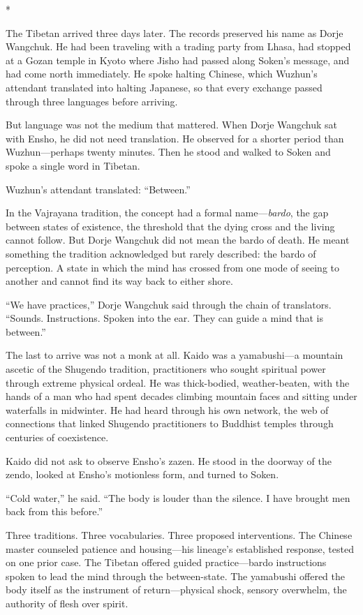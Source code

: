\begin{center}
*\quad*\quad*
\end{center}

The Tibetan arrived three days later. The records preserved his name as Dorje Wangchuk. He had been traveling with a trading party from Lhasa, had stopped at a Gozan temple in Kyoto where Jisho had passed along Soken's message, and had come north immediately. He spoke halting Chinese, which Wuzhun's attendant translated into halting Japanese, so that every exchange passed through three languages before arriving.

But language was not the medium that mattered. When Dorje Wangchuk sat with Ensho, he did not need translation. He observed for a shorter period than Wuzhun---perhaps twenty minutes. Then he stood and walked to Soken and spoke a single word in Tibetan.

Wuzhun's attendant translated: ``Between.''

In the Vajrayana tradition, the concept had a formal name---\emph{bardo}, the gap between states of existence, the threshold that the dying cross and the living cannot follow. But Dorje Wangchuk did not mean the bardo of death. He meant something the tradition acknowledged but rarely described: the bardo of perception. A state in which the mind has crossed from one mode of seeing to another and cannot find its way back to either shore.

``We have practices,'' Dorje Wangchuk said through the chain of translators. ``Sounds. Instructions. Spoken into the ear. They can guide a mind that is between.''

The last to arrive was not a monk at all. Kaido was a yamabushi---a mountain ascetic of the Shugendo tradition, practitioners who sought spiritual power through extreme physical ordeal. He was thick-bodied, weather-beaten, with the hands of a man who had spent decades climbing mountain faces and sitting under waterfalls in midwinter. He had heard through his own network, the web of connections that linked Shugendo practitioners to Buddhist temples through centuries of coexistence.

Kaido did not ask to observe Ensho's zazen. He stood in the doorway of the zendo, looked at Ensho's motionless form, and turned to Soken.

``Cold water,'' he said. ``The body is louder than the silence. I have brought men back from this before.''

Three traditions. Three vocabularies. Three proposed interventions. The Chinese master counseled patience and housing---his lineage's established response, tested on one prior case. The Tibetan offered guided practice---bardo instructions spoken to lead the mind through the between-state. The yamabushi offered the body itself as the instrument of return---physical shock, sensory overwhelm, the authority of flesh over spirit.

